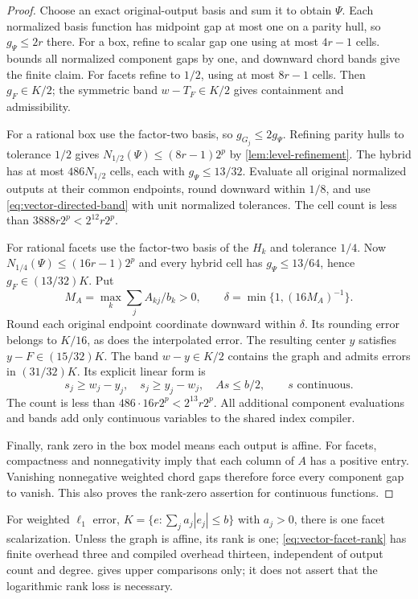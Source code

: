 \begin{proof}
Choose an exact original-output basis and sum it to obtain $\Psi$.
Each normalized basis function has midpoint gap at most one on a
parity hull, so $g_\Psi\le2r$ there. For a box, refine to scalar gap
one using at most $4r-1$ cells.  bounds
all normalized component gaps by one, and downward chord bands give
the finite claim. For facets refine to $1/2$, using at most $8r-1$
cells. Then $g_F\in K/2$; the symmetric band $w-T_F\in K/2$ gives
containment and admissibility.

For a rational box use the factor-two basis, so
$g_{G_j}\le2g_\Psi$. Refining parity hulls to tolerance $1/2$ gives
$N_{1/2}(\Psi)\le(8r-1)2^p$ by \cref{lem:level-refinement}.
The hybrid has at most $486N_{1/2}$ cells, each with
$g_\Psi\le13/32$. Evaluate all original normalized outputs at their
common endpoints, round downward within $1/8$, and use
\eqref{eq:vector-directed-band} with unit normalized tolerances.
The cell count is less than $3888r2^p<2^{12}r2^p$.

For rational facets use the factor-two basis of the $H_k$ and tolerance
$1/4$. Now $N_{1/4}(\Psi)\le(16r-1)2^p$ and every hybrid cell has
$g_\Psi\le13/64$, hence $g_F\in(13/32)K$. Put
\[
 M_A=\max_k\sum_j A_{kj}/b_k>0,
 \qquad \delta=\min\{1,(16M_A)^{-1}\}.
\]
Round each original endpoint coordinate downward within $\delta$.
Its rounding error belongs to $K/16$, as does the interpolated error.
The resulting center $y$ satisfies $y-F\in(15/32)K$.
The band $w-y\in K/2$ contains the graph and admits errors in
$(31/32)K$. Its explicit linear form is
\begin{equation}\label{eq:facet-linear-band}
 s_j\ge w_j-y_j,\quad s_j\ge y_j-w_j,\quad As\le b/2,
 \qquad s\text{ continuous}.
\end{equation}
The count is less than $486\cdot16r2^p<2^{13}r2^p$.
All additional component evaluations and bands add only continuous
variables to the shared index compiler.

Finally, rank zero in the box model means each output is affine.
For facets, compactness and nonnegativity imply that each column of
$A$ has a positive entry. Vanishing nonnegative weighted chord gaps
therefore force every component gap to vanish. This also proves the
rank-zero assertion for continuous functions.
\end{proof}

For weighted $\ell_1$ error, $K=\{e:\sum_j a_j|e_j|\le b\}$ with
$a_j>0$, there is one facet scalarization. Unless the graph is affine,
its rank is one; \eqref{eq:vector-facet-rank} has finite overhead three
and compiled overhead thirteen, independent of output count and degree.
 gives upper comparisons only; it does not assert
that the logarithmic rank loss is necessary.

